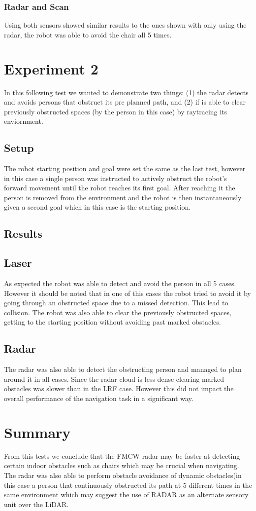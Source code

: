 \subsubsection{Radar and Scan}
Using both sensors showed similar results to the ones shown with only using the radar, the robot was able to avoid the chair all 5 times. 
\section {Experiment 2}
In this following test we wanted to demonstrate two things: (1) the radar detects and avoids persons that obstruct its pre planned path, and (2) if is able to clear previously obstructed spaces (by the person in this case) by raytracing its enviornment. 
\subsection{Setup}
The robot starting position and goal were set the same as the last test, however in this case a single person was instructed to actively obstruct the robot's forward movement until the robot reaches its first goal. After reaching it the person is removed from the environment  and the robot is then instantaneously given a second goal which in this case is the starting position.
\subsection{Results}
\subsection{Laser}
As expected the robot was able to detect and avoid the person in all 5 cases. However it should be noted that in one of this cases the robot tried to avoid it by going through an obstructed space due to a missed detection. This lead to collision. The robot was also able to clear the previously obstructed spaces, getting to the starting position without avoiding past marked obstacles.
\subsection{Radar}
The radar was also able to detect the obstructing person and managed to plan around it in all cases. Since the radar cloud is less dense clearing marked obstacles was slower than in the \ac{LRF} case. However this did not impact the overall performance of the navigation task in a significant way.
\section{Summary}
From this tests we conclude that the \ac{FMCW} radar may be faster at detecting certain indoor obstacles such as chairs which may be crucial when navigating. The radar was also able to perform 
obstacle avoidance of dynamic obstacles(in this case a person that continuously obstructed its path at 5 different times in the same environment which may suggest the use of \ac{RADAR} as an alternate sensory unit over the \ac{LiDAR}.